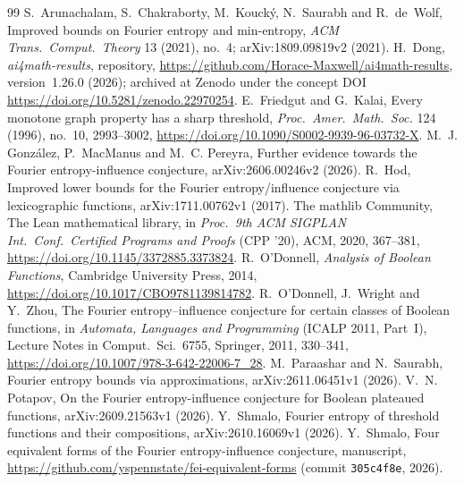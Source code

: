 \documentclass[11pt]{article}
\theoremstyle{definition}
\theoremstyle{remark}
\newcommand{\repoversion}{1.26.0}
\begin{document}
{\footnotesize
\begin{thebibliography}{99}
\setlength{\itemsep}{0pt}
 S.~Arunachalam, S.~Chakraborty, M.~Kouck\'y, N.~Saurabh and
R.~de~Wolf, Improved bounds on Fourier entropy and min-entropy, \emph{ACM
Trans.\ Comput.\ Theory} 13 (2021), no.~4; arXiv:1809.09819v2 (2021).
 H.~Dong, \emph{ai4math-results}, repository,
\url{https://github.com/Horace-Maxwell/ai4math-results}, version~\repoversion{}
(2026); archived at Zenodo under the concept DOI
\url{https://doi.org/10.5281/zenodo.22970254}.
 E.~Friedgut and G.~Kalai, Every monotone graph property has a sharp
threshold, \emph{Proc.\ Amer.\ Math.\ Soc.} 124 (1996), no.~10, 2993--3002,
\url{https://doi.org/10.1090/S0002-9939-96-03732-X}.
 M.~J. Gonz\'alez, P.~MacManus and M.~C. Pereyra, Further evidence
towards the Fourier entropy-influence conjecture, arXiv:2606.00246v2 (2026).
 R.~Hod, Improved lower bounds for the Fourier entropy/influence
conjecture via lexicographic functions, arXiv:1711.00762v1 (2017).
The mathlib Community, The Lean mathematical library, in \emph{Proc.\ 9th ACM
SIGPLAN Int.\ Conf.\ Certified Programs and Proofs} (CPP '20), ACM, 2020,
367--381, \url{https://doi.org/10.1145/3372885.3373824}.
 R.~O'Donnell, \emph{Analysis of Boolean Functions}, Cambridge
University Press, 2014, \url{https://doi.org/10.1017/CBO9781139814782}.
 R.~O'Donnell, J.~Wright and Y.~Zhou, The Fourier entropy--influence
conjecture for certain classes of Boolean functions, in \emph{Automata,
Languages and Programming} (ICALP 2011, Part~I), Lecture Notes in Comput.\ Sci.\
6755, Springer, 2011, 330--341, \url{https://doi.org/10.1007/978-3-642-22006-7_28}.
\bibitem{ps} M.~Paraashar and N.~Saurabh, Fourier entropy bounds via
approximations, arXiv:2611.06451v1 (2026).
 V.~N. Potapov, On the Fourier entropy-influence conjecture for
Boolean plateaued functions, arXiv:2609.21563v1 (2026).
 Y.~Shmalo, Fourier entropy of threshold functions and their
compositions, arXiv:2610.16069v1 (2026).
 Y.~Shmalo, Four equivalent forms of the Fourier entropy-influence
conjecture, manuscript,
\url{https://github.com/yspennstate/fei-equivalent-forms} (commit
\texttt{305c4f8e}, 2026).
\end{thebibliography}}
\end{document}
